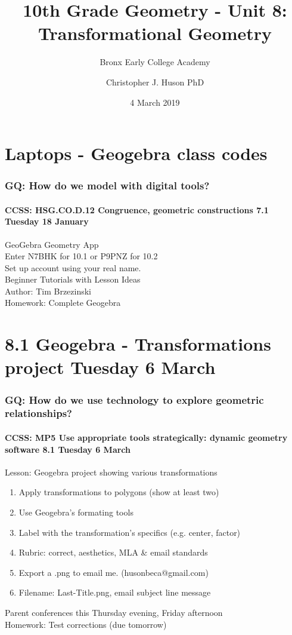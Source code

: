 \documentclass{beamer}
\title{10th Grade Geometry - Unit 8: Transformational Geometry}
\subtitle{Bronx Early College Academy}
\author{Christopher J. Huson PhD}
\date{4 March 2019}
\begin{document}
\frame{\titlepage}
\section[Outline]{}
\frame{\tableofcontents}


\section{Laptops - Geogebra class codes}
  \frame
  {
    \frametitle{GQ: How do we model with digital tools?}
    \framesubtitle{CCSS: HSG.CO.D.12 Congruence, geometric constructions  \alert{7.1 Tuesday 18 January}}

    GeoGebra Geometry App\\
    Enter \alert{N7BHK} for 10.1 or \alert{P9PNZ} for 10.2\\
    Set up account using your real name.\\
    Beginner Tutorials with Lesson Ideas\\
    Author: Tim Brzezinski\\[0.5cm]
    Homework: Complete Geogebra
  }

\section{8.1 Geogebra - Transformations project Tuesday 6 March}
  \frame
  {
    \frametitle{GQ: How do we use technology to explore geometric relationships?}
    \framesubtitle{CCSS: MP5 Use appropriate tools strategically: dynamic geometry software \hfill \alert{8.1 Tuesday 6 March}}

    \begin{block}{Lesson: Geogebra project showing various transformations}
      \begin{enumerate}
        \item Apply transformations to polygons (show at least two)
        \item Use Geogebra's formating tools
        \item Label with the transformation's specifics (e.g. center, factor)
        \item Rubric: correct, aesthetics, \alert{MLA \& email standards}
        \item Export a .png to email me. (husonbeca@gmail.com)
        \item Filename: Last-Title.png, email subject line message
      \end{enumerate}
    \end{block}
    \alert{Parent conferences this Thursday evening, Friday afternoon}\\
    Homework: Test corrections  (due tomorrow)
  }
\end{document}
